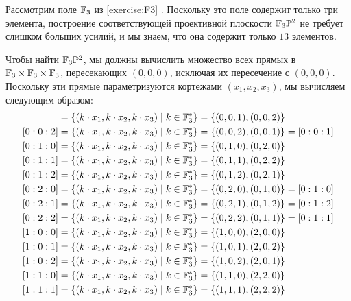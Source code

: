 \begin{example} Рассмотрим поле $\mathbb{F}_3$ из \exercisename{} \ref{exercise:F3} . Поскольку это поле содержит только три элемента, построение соответствующей проективной плоскости $\mathbb{F}_3\mathbb{P}^2$ не требует слишком больших усилий, и мы знаем, что она содержит только $13$ элементов.

Чтобы найти $\mathbb{F}_3\mathbb{P}^2$, мы должны вычислить множество всех прямых в $\mathbb{F}_3\times \mathbb{F}_3\times \mathbb{F}_3$, пересекающих $(0,0,0)$, исключая их пересечение с $(0,0,0)$. Поскольку эти прямые параметризуются кортежами $(x_1,x_2,x_3)$, мы вычисляем следующим образом:
\begin{align*}
[0:0:1] &= \{(k\cdot x_1,k\cdot x_2, k\cdot x_3)\;|\; k\in\F_3^*\}
          = \{(0,0,1), (0,0,2)\}\\
[0:0:2] &= \{(k\cdot x_1,k\cdot x_2, k\cdot x_3)\;|\; k\in\F_3^*\}
          = \{(0,0,2), (0,0,1)\}
          = [0:0:1]\\
[0:1:0] &= \{(k\cdot x_1,k\cdot x_2, k\cdot x_3)\;|\; k\in\F_3^*\}
          = \{(0,1,0), (0,2,0)\}\\
[0:1:1] &= \{(k\cdot x_1,k\cdot x_2, k\cdot x_3)\;|\; k\in\F_3^*\}
          = \{(0,1,1), (0,2,2)\}\\
[0:1:2] &= \{(k\cdot x_1,k\cdot x_2, k\cdot x_3)\;|\; k\in\F_3^*\}
          = \{(0,1,2), (0,2,1)\}\\
[0:2:0] &= \{(k\cdot x_1,k\cdot x_2, k\cdot x_3)\;|\; k\in\F_3^*\}
          = \{(0,2,0), (0,1,0)\}
          = [0:1:0]\\
[0:2:1] &= \{(k\cdot x_1,k\cdot x_2, k\cdot x_3)\;|\; k\in\F_3^*\}
          = \{(0,2,1), (0,1,2)\}
          = [0:1:2]\\
[0:2:2] &= \{(k\cdot x_1,k\cdot x_2, k\cdot x_3)\;|\; k\in\F_3^*\}
          = \{(0,2,2), (0,1,1)\}
          = [0:1:1]\\
[1:0:0] &= \{(k\cdot x_1,k\cdot x_2, k\cdot x_3)\;|\; k\in\F_3^*\}
          = \{(1,0,0), (2,0,0)\}\\
[1:0:1] &= \{(k\cdot x_1,k\cdot x_2, k\cdot x_3)\;|\; k\in\F_3^*\}
          = \{(1,0,1), (2,0,2)\}\\
[1:0:2] &= \{(k\cdot x_1,k\cdot x_2, k\cdot x_3)\;|\; k\in\F_3^*\}
          = \{(1,0,2), (2,0,1)\}\\
[1:1:0] &= \{(k\cdot x_1,k\cdot x_2, k\cdot x_3)\;|\; k\in\F_3^*\}
          = \{(1,1,0), (2,2,0)\}\\
[1:1:1] &= \{(k\cdot x_1,k\cdot x_2, k\cdot x_3)\;|\; k\in\F_3^*\}
          = \{(1,1,1), (2,2,2)\}\\

\end{align*}
\end{example}
